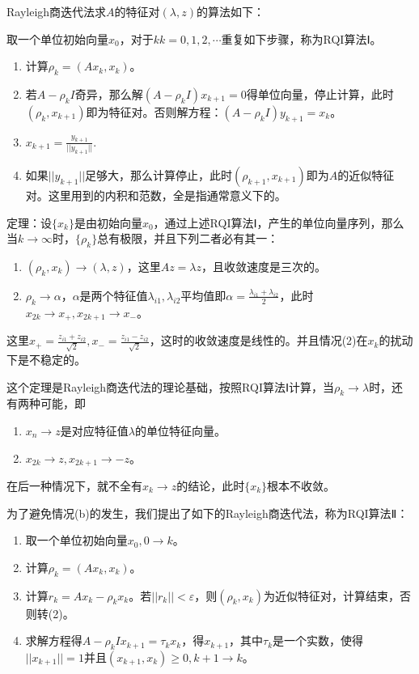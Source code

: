 \documentclass[UTF8]{ctexart}
\begin{document}
    Rayleigh商迭代法求$A$的特征对$(\lambda,z)$的算法如下：

    取一个单位初始向量$x_0$，对于$kk=0,1,2,\cdots$重复如下步骤，称为RQI算法Ⅰ。
    \begin{enumerate}[label=(\arabic*),itemindent=2em,fullwidth]
        \item 计算$\rho_k=(Ax_k,x_k)$。
        \item 若$A-\rho_kI$奇异，那么解$(A-\rho_kI)x_{k+1}=0$得单位向量，停止计算，此时$(\rho_k,x_{k+1})$即为特征对。否则解方程：$(A-\rho_kI)y_{k+1}=x_k$。
        \item $\displaystyle x_{k+1}=\frac{y_{k+1}}{||y_{k+1}||}$.
        \item 如果$||y_{k+1}||$足够大，那么计算停止，此时$(\rho_{k+1},x_{k+1})$即为$A$的近似特征对。这里用到的内积和范数，全是指通常意义下的。
    \end{enumerate}

    定理：设$\{x_k\}$是由初始向量$x_0$，通过上述RQI算法Ⅰ，产生的单位向量序列，那么当$k\to\infty$时，$\{\rho_k\}$总有极限，并且下列二者必有其一：
    \begin{enumerate}[label=(\arabic*),itemindent=2em,fullwidth]
        \item $(\rho_k,x_k)\to(\lambda,z)$，这里$Az=\lambda z$，且收敛速度是三次的。
        \item $\rho_k\to\alpha$，$\alpha$是两个特征值$\lambda_{i1},\lambda_{i2}$平均值即$\displaystyle \alpha=\frac{\lambda_{i1}+\lambda_{i2}}{2}$，此时$x_{2k}\to x_+,x_{2k+1}\to x_-$。
    \end{enumerate}
    这里$\displaystyle x_+=\frac{z_{i1}+z_{i2}}{\sqrt{2}},x_-=\frac{z_{i1}-z_{i2}}{\sqrt{2}}$，这时的收敛速度是线性的。并且情况(2)在$x_k$的扰动下是不稳定的。

    这个定理是Rayleigh商迭代法的理论基础，按照RQI算法Ⅰ计算，当$\rho_k\to\lambda$时，还有两种可能，即
    \begin{enumerate}[label=(\alph*),itemindent=2em,fullwidth]
        \item $x_n\to z$是对应特征值$\lambda$的单位特征向量。
        \item $x_{2k}\to z,x_{2k+1}\to -z$。
    \end{enumerate}
    在后一种情况下，就不全有$x_k\to z$的结论，此时$\{x_k\}$根本不收敛。

    为了避免情况(b)的发生，我们提出了如下的Rayleigh商迭代法，称为RQI算法Ⅱ：
    \begin{enumerate}[label=(\arabic*),itemindent=2em,fullwidth]
        \item 取一个单位初始向量$x_0,0\to k$。
        \item 计算$\rho_k=(Ax_k,x_k)$。
        \item 计算$r_k=Ax_k-\rho_kx_k$。若$||r_k||<\varepsilon$，则$(\rho_k,x_k)$为近似特征对，计算结束，否则转(2)。
        \item 求解方程得$A-\rho_kIx_{k+1}=\tau_kx_k$，得$x_{k+1}$，其中$\tau_k$是一个实数，使得$||x_{k+1}||=1$并且$(x_{k+1},x_k)\geq0,k+1\to k$。
    \end{enumerate}
\end{document}

